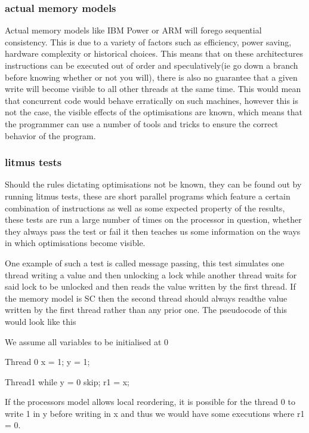 \documentclass[a4]{article}
\begin{document}
\subsubsection{actual memory models}

Actual memory models like IBM Power or ARM will forego sequential consistency. This is due to a variety of factors such as efficiency, power saving, hardware complexity or historical choices. This means that on these architectures instructions can be executed out of order and speculatively(ie go down a branch before knowing whether or not you will), there is also no guarantee that a given write will become visible to all other threads at the same time. This would mean that concurrent code would behave erratically on such machines, however this is not the case, the visible effects of the optimisations are known, which means that the programmer can use a number of tools and tricks to ensure the correct behavior of the program.

\subsubsection{litmus tests}

Should the rules dictating optimisations not be known, they can be found out by running litmus tests, these are short parallel programs which feature a certain combination of instructions as well as some expected property of the results, these tests are run a large number of times on the processor in question, whether they always pass the test or fail it then teaches us some information on the ways in which optimisations become visible.

One example of such a test is called message passing, this test simulates one thread writing a value and then unlocking a lock while another thread waits for said lock to be unlocked and then reads the value written by the first thread. If the memory model is SC then the second thread should always readthe value written by the first thread rather than any prior one. The pseudocode of this would look like this

We assume all variables to be initialised at 0

Thread 0
x = 1;
y = 1;

Thread1
while y = 0 {
  skip;
}
r1 = x;

If the processors model allows local reordering, it is possible for the thread 0 to write 1 in y before writing in x and thus we would have some executions where r1 = 0.
\end{document}
